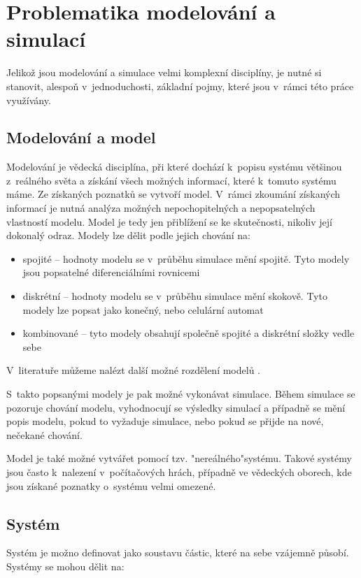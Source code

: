 \section{Problematika modelování a simulací}
Jelikož jsou modelování a simulace velmi komplexní disciplíny, je nutné si stanovit, alespoň v~jednoduchosti, základní pojmy, které jsou v~rámci této práce využívány.

\subsection{Modelování a model}
\label{modelovani}
Modelování je vědecká disciplína, při které dochází k~popisu systému většinou z~reálného světa a získání všech možných informací, které k~tomuto systému máme. Ze získaných poznatků se vytvoří model. V~rámci zkoumání získaných informací je nutná analýza možných nepochopitelných a nepopsatelných vlastností modelu. Model je tedy jen přiblížení se ke skutečnosti, nikoliv její dokonalý odraz. Modely lze dělit podle jejich chování na:

\begin{itemize}
    \item spojité -- hodnoty modelu se v~průběhu simulace mění spojitě. Tyto modely jsou popsatelné diferenciálními rovnicemi
    \item diskrétní -- hodnoty modelu se v~průběhu simulace mění skokově. Tyto modely lze popsat jako konečný, nebo celulární automat
    \item kombinované -- tyto modely obsahují společně spojité a diskrétní složky vedle sebe
\end{itemize}

V~literatuře můžeme nalézt další možné rozdělení modelů \cite{IMS-skripta}.
\newline

S~takto popsanými modely je pak možné vykonávat simulace. Během simulace se pozoruje chování modelu, vyhodnocují se výsledky simulací a případně se mění popis modelu, pokud to vyžaduje simulace, nebo pokud se přijde na nové, nečekané chování.

Model je také možné vytvářet pomocí tzv. "nereálného"\space systému. Takové systémy jsou často k~nalezení v~počítačových hrách, případně ve vědeckých oborech, kde jsou získané poznatky o~systému velmi omezené.

\subsection{Systém}
Systém je možno definovat jako soustavu částic, které na sebe vzájemně působí. Systémy se mohou dělit na:

